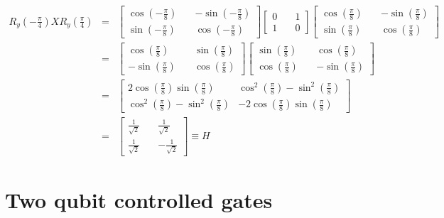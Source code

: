 \documentclass[preprint,aps,prd,nofootinbib,superscriptaddress]{revtex4-2}
\begin{document}
\begin{eqnarray} \label{eqn:H_from_X}
R_y \left(-\frac{\pi}{4}\right) X R_y \left(\frac{\pi}{4}\right) &=& 
\begin{bmatrix} 
\cos\left(-\frac{\pi}{8}\right) \quad & - \sin\left(-\frac{\pi}{8}\right) \\ 
\sin\left(-\frac{\pi}{8}\right) \quad & \cos\left(-\frac{\pi}{8}\right) 
\end{bmatrix} 
\begin{bmatrix} 
0 \quad & 1 \\ 
1 \quad & 0 
\end{bmatrix} 
\begin{bmatrix} 
\cos\left(\frac{\pi}{8}\right) \quad & - \sin\left(\frac{\pi}{8}\right) \\ 
\sin\left(\frac{\pi}{8}\right) \quad & \cos\left(\frac{\pi}{8}\right) 
\end{bmatrix}
\nonumber \\
&=& \begin{bmatrix} 
\cos\left(\frac{\pi}{8}\right) \quad & \sin\left(\frac{\pi}{8}\right) \\ 
-\sin\left(\frac{\pi}{8}\right) \quad & \cos\left(\frac{\pi}{8}\right) 
\end{bmatrix} 
\begin{bmatrix} 
\sin\left(\frac{\pi}{8}\right) \quad & \cos\left(\frac{\pi}{8}\right) \\ 
\cos\left(\frac{\pi}{8}\right) \quad & - \sin\left(\frac{\pi}{8}\right) 
\end{bmatrix} 
\nonumber \\
&=& \begin{bmatrix} 
2 \cos\left(\frac{\pi}{8}\right) \sin\left(\frac{\pi}{8}\right) \quad & \cos^2 \left(\frac{\pi}{8}\right) - \sin^2 \left(\frac{\pi}{8}\right) \\ 
\cos^2 \left(\frac{\pi}{8}\right) - \sin^2 \left(\frac{\pi}{8}\right) & -2 \cos\left(\frac{\pi}{8}\right) \sin\left(\frac{\pi}{8}\right) 
\end{bmatrix} 
\nonumber \\
&=& \begin{bmatrix} 
\frac{1}{\sqrt{2}} \quad & \frac{1}{\sqrt{2}} \\ 
\frac{1}{\sqrt{2}} & -\frac{1}{\sqrt{2}} 
\end{bmatrix} \equiv H
\end{eqnarray}


\section{Two qubit controlled gates}
%
\end{document}
